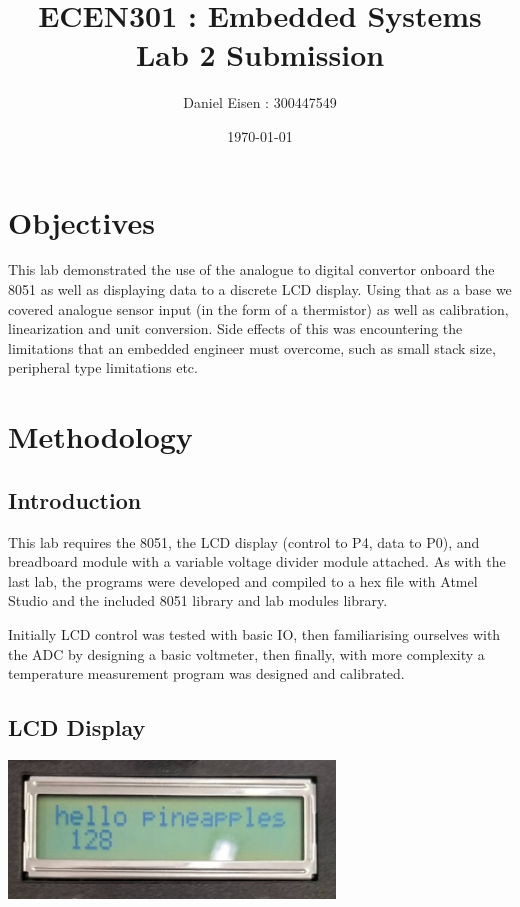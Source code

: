 \documentclass[11pt]{article}
\title{ECEN301 : Embedded Systems \\ Lab 2 Submission}
\author{Daniel Eisen : 300447549}
\date{\today}
\begin{document}
\begin{preview}
\maketitle
\section{Objectives}
This lab demonstrated the use of the analogue to digital convertor onboard the 8051 as well as displaying data to a discrete LCD display. Using that as a base we covered analogue sensor input (in the form of a thermistor) as well as calibration, linearization and unit conversion. Side effects of this was encountering the limitations that an embedded engineer must overcome, such as small stack size, peripheral type limitations etc.

\section{Methodology}
        \subsection{Introduction}
        This lab requires the 8051, the LCD display (control to P4, data to P0), and breadboard module with a variable voltage divider module attached. As with the last lab, the programs were developed and compiled to a hex file with Atmel Studio and the included 8051 library and lab modules library.
        
        
        Initially LCD control was tested with basic IO, then familiarising ourselves with the ADC by designing a basic voltmeter, then finally, with more complexity a temperature measurement program was designed and calibrated.   

        \subsection{LCD Display}
        \begin{center}
                \includegraphics[width=0.65\textwidth]{res/LCD0.jpg}


\end{center}
\end{preview}
\end{document}
